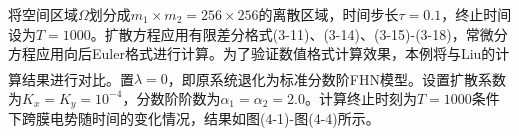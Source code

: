 \documentclass[twoside,UTF8]{nputhesis}
\newcommand{\upcite}[1]{\textsuperscript{\textsuperscript{\cite{#1}}}}
\begin{document}
将空间区域$\Omega $划分成${{m}_{1}}\times {{m}_{2}}=256\times 256$的离散区域，时间步长$\tau =0.1$，终止时间设为$T=1000$。扩散方程应用有限差分格式(3-11)、(3-14)、(3-15)-(3-18)，常微分方程应用向后Euler格式进行计算。为了验证数值格式计算效果，本例将与Liu的计算结果\upcite{liu2013numerical}进行对比。置$\lambda =0$，即原系统退化为标准分数阶FHN模型。设置扩散系数为${{K}_{x}}={{K}_{y}}={{10}^{-4}}$，分数阶阶数为${{\alpha }_{1}}={{\alpha }_{2}}=2.0$。计算终止时刻为$T=1000$条件下跨膜电势随时间的变化情况，结果如图(4-1)-图(4-4)所示。
\begin{figure}[htbp]
	\centering
	
	

\end{figure}
\end{document}
